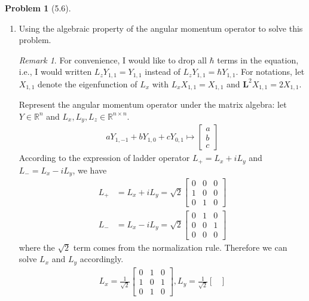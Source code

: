 \documentclass[twoside,11pt]{article}
\newcommand{\RR}{\mathbb{R}}
\theoremstyle{definition}
\newtheorem{problem}{Problem}
\theoremstyle{remark}
\newtheorem*{remark}{Remark}
\begin{document}
\begin{problem}[5.6]
\begin{enumerate}[label=(\alph*)]
        \item Using the algebraic property of the angular momentum operator to solve this problem.
        \begin{remark}
            For convenience, I would like to drop all $\hbar$ terms in the equation, i.e.,
            I would written $L_z Y_{1,1} = Y_{1,1}$ instead of $L_z Y_{1,1}=\hbar Y_{1,1}$.
            For notations, let $X_{1,1}$ denote the eigenfunction of $L_x$ with
            $L_x X_{1,1} = X_{1,1}$ and $\mathbf{L}^2 X_{1,1} = 2 X_{1,1}$.
        \end{remark}
        Represent the angular momentum operator under the matrix algebra: 
        let $Y\in\RR^n$ and $L_x, L_y, L_z\in\RR^{n\times n}$.
        \begin{align*}
            aY_{1,-1} + bY_{1,0} + cY_{0,1}\mapsto \begin{bmatrix}
                a\\ b\\ c
            \end{bmatrix}
        \end{align*}
        According to the expression of ladder operator $L_+=L_x+iL_y$ and 
        $L_-=L_x-iL_y$, we have
        \begin{align*}
            L_+ &= L_x + i L_y = \sqrt{2}\begin{bmatrix}
                0 & 0 & 0 \\
                1 & 0 & 0 \\
                0 & 1 & 0
            \end{bmatrix}\\
            L_- &= L_x - i L_y = \sqrt{2}\begin{bmatrix}
                0 & 1 & 0 \\
                0 & 0 & 1 \\
                0 & 0 & 0
            \end{bmatrix}
        \end{align*}
        where the $\sqrt{2}$ term comes from the normalization rule.
        Therefore we can solve $L_x$ and $L_y$ accordingly.
        \begin{align*}
            L_x = \frac{1}{\sqrt{2}}\begin{bmatrix}
                0 & 1 & 0\\
                1 & 0 & 1\\
                0 & 1 & 0
            \end{bmatrix}, 
            L_y = \frac{1}{\sqrt{2}}\begin{bmatrix}

\end{bmatrix}
\end{align*}
\end{enumerate}
\end{problem}
\end{document}
